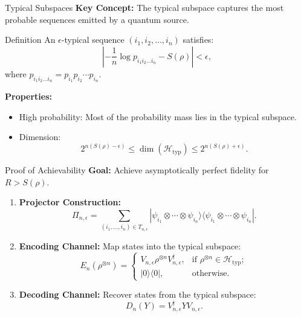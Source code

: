 \begin{frame}{Typical Subspaces}
    \textbf{Key Concept:} The typical subspace captures the most probable sequences emitted by a quantum source.
    \begin{block}{Definition}
        An \(\epsilon\)-typical sequence \((i_1, i_2, \dots, i_n)\) satisfies:
        \[
        \left| -\frac{1}{n} \log p_{i_1 i_2 \dots i_n} - S(\rho) \right| < \epsilon,
        \]
        where \( p_{i_1 i_2 \dots i_n} = p_{i_1} p_{i_2} \cdots p_{i_n} \).
    \end{block}
    \textbf{Properties:}
    \begin{itemize}
        \item High probability: Most of the probability mass lies in the typical subspace.
        \item Dimension: 
        \[
        2^{n(S(\rho) - \epsilon)} \leq \dim(\mathcal{H}_{\text{typ}}) \leq 2^{n(S(\rho) + \epsilon)}.
        \]
    \end{itemize}
\end{frame}

\begin{frame}{Proof of Achievability}
    \textbf{Goal:} Achieve asymptotically perfect fidelity for \( R > S(\rho) \).
    \begin{enumerate}
        \item \textbf{Projector Construction:}
        \[
        \Pi_{n, \epsilon} = \sum_{(i_1, \dots, i_n) \in T_{n, \epsilon}} |\psi_{i_1} \otimes \cdots \otimes \psi_{i_n}\rangle \langle \psi_{i_1} \otimes \cdots \otimes \psi_{i_n}|.
        \]
        \item \textbf{Encoding Channel:} Map states into the typical subspace:
        \[
        E_n(\rho^{\otimes n}) = 
        \begin{cases}
            V_{n, \epsilon} \rho^{\otimes n} V_{n, \epsilon}^\dagger, & \text{if } \rho^{\otimes n} \in \mathcal{H}_{\text{typ}}; \\
            |0\rangle\langle 0|, & \text{otherwise.}
        \end{cases}
        \]
        \item \textbf{Decoding Channel:} Recover states from the typical subspace:
        \[
        D_n(Y) = V_{n, \epsilon}^\dagger Y V_{n, \epsilon}.
        \]
    \end{enumerate}
\end{frame}

